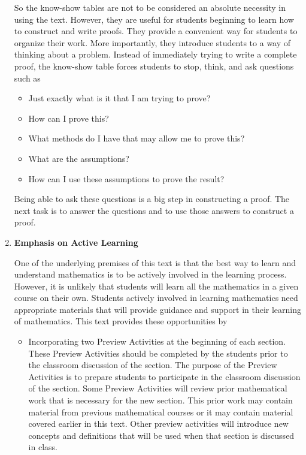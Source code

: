 \begin{enumerate}
So the know-show tables are not to be considered an absolute necessity in using the text.  However, they are useful for students beginning to learn how to construct and write proofs.  They provide a convenient way for students to organize their work.  More importantly, they introduce students to a way of thinking about a problem.  Instead of immediately trying to write a complete proof, the know-show table forces students to stop, think, and ask questions such as

\begin{itemize}
\item Just exactly what is it that I am trying to prove?
\item How can I prove this?
\item What methods do I have that may allow me to prove this?
\item What are the assumptions?
\item How can I use these assumptions to prove the result?
\end{itemize}

Being able to ask these questions is a big step in constructing a proof.  The next task is to answer the questions and to use those answers to construct a proof.


\item \textbf{Emphasis on Active Learning}

One of the underlying premises of this text is that the best way to learn and understand mathematics is to be actively involved in the learning process.  However, it is unlikely that  students will learn all the mathematics in a given course on their own.  Students actively involved in learning mathematics need appropriate materials that will provide guidance and support in their learning of mathematics.  This text provides these opportunities by
\begin{itemize}
\item Incorporating two Preview Activities at the beginning of each section.  These Preview Activities should be completed by the students prior to the classroom discussion of the section.  The purpose of the Preview Activities is to prepare students to participate in the classroom discussion of the section.  Some Preview Activities will review prior mathematical work that is necessary for the new section.  This prior work may contain material from previous mathematical courses or it may contain material covered earlier in this text.  Other preview activities will introduce new concepts and definitions that will be used when that section is discussed in class.


\end{itemize}
\end{enumerate}

